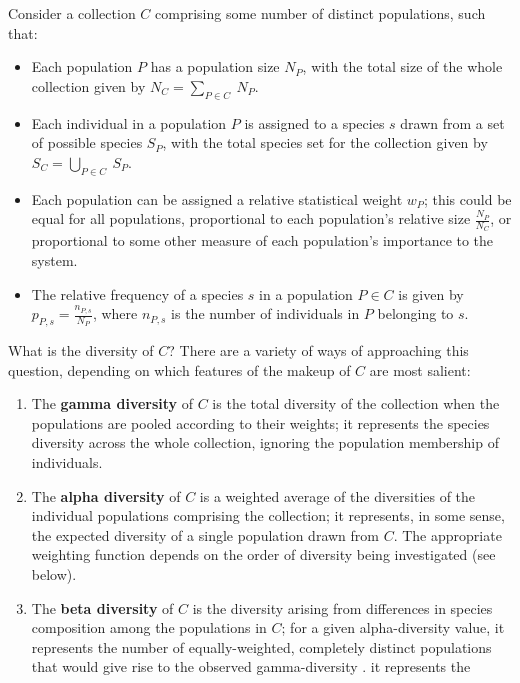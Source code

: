 Consider a collection $C$ comprising some number of distinct populations, such that:

\begin{itemize} %
\item Each population $P$ has a population size $N_P$, with the total size of the whole collection given by $N_C = \sum_{P \in C}~N_P$.
\item Each individual in a population $P$ is assigned to a species $s$ drawn from a set of possible species $S_P$, with the total species set for the collection given by $S_C = \bigcup_{P \in C}~S_P$.
\item Each population can be assigned a relative statistical weight $w_P$; this could be equal for all populations, proportional to each population's relative size $\frac{N_P}{N_C}$, or proportional to some other measure of each population's importance to the system.
\item The relative frequency of a species $s$ in a population $P \in C$ is given by $p_{P,s} = \frac{n_{P,s}}{N_P}$, where $n_{P,s}$ is the number of individuals in $P$ belonging to $s$.
\end{itemize}

What is the diversity of $C$? There are a variety of ways of approaching this question, depending on which features of the makeup of $C$ are most salient:

\begin{enumerate}
\item The \textbf{gamma diversity} of $C$ is the total diversity of the collection when the populations are pooled according to their weights; it represents the species diversity across the whole collection, ignoring the population membership of individuals.
\item The \textbf{alpha diversity} of $C$ is a weighted average of the diversities of the individual populations comprising the collection; it represents, in some sense, the expected diversity of a single population drawn from $C$. The appropriate weighting function depends on the order of diversity being investigated (see below).
\item The \textbf{beta diversity} of $C$ is the diversity arising from differences in species composition among the populations in $C$; for a given alpha-diversity value, it represents the number of equally-weighted, completely distinct populations that would give rise to the observed gamma-diversity \citep{jost2007partitioning}.
it represents the 
\end{enumerate}

